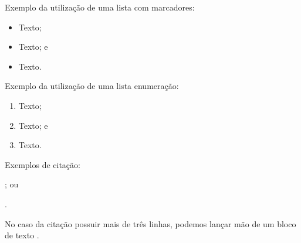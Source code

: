 \documentclass[
    12pt,               %
    openright,          %
    oneside,            %
    a4paper,            %
    english,            %
    french,             %
    spanish,            %
    brazil              %
    ]{abntex2}
\begin{document}
\begin{anexosenv}
Exemplo da utiliza\c cão  de uma lista com marcadores:

\begin{itemize}
    \item Texto;
    \item Texto; e
    \item Texto.
\end{itemize}

Exemplo da utiliza\c cão  de uma lista  enumera\c cão:

\begin{enumerate}
    \item Texto;
    \item Texto; e
    \item Texto.
\end{enumerate}


Exemplos de cita\c cão: 

\cite[p. 10]{author2020}; ou 

.

\begin{citacao}
No caso da cita\c cão possuir mais de três linhas, podemos lan\c car mão de um bloco de texto \cite[p. 44]{author2020}.
\end{citacao}

\end{anexosenv}

\printindex
\end{document}
